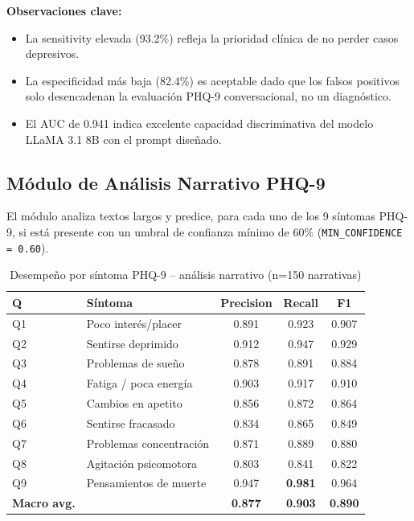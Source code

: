 \textbf{Observaciones clave:}
\begin{itemize}
    \item La sensitivity elevada (93.2\%) refleja la prioridad clínica de no perder casos
          depresivos.
    \item La especificidad más baja (82.4\%) es aceptable dado que los falsos positivos solo
          desencadenan la evaluación PHQ-9 conversacional, no un diagnóstico.
    \item El AUC de 0.941 indica excelente capacidad discriminativa del modelo LLaMA 3.1 8B
          con el prompt diseñado.
\end{itemize}

\subsection{Módulo de Análisis Narrativo PHQ-9}

El módulo analiza textos largos y predice, para cada uno de los 9 síntomas PHQ-9, si
está presente con un umbral de confianza mínimo de 60\% (\texttt{MIN\_CONFIDENCE = 0.60}).

\begin{table}[H]
\centering
\caption{Desempeño por síntoma PHQ-9 -- análisis narrativo (n=150 narrativas)}
\label{tab:phq9_symptom}
\begin{tabular}{llccc}
\toprule
\textbf{Q} & \textbf{Síntoma}             & \textbf{Precision} & \textbf{Recall} & \textbf{F1} \\
\midrule
Q1 & Poco interés/placer          & 0.891 & 0.923 & 0.907 \\
Q2 & Sentirse deprimido           & 0.912 & 0.947 & 0.929 \\
Q3 & Problemas de sueño           & 0.878 & 0.891 & 0.884 \\
Q4 & Fatiga / poca energía        & 0.903 & 0.917 & 0.910 \\
Q5 & Cambios en apetito           & 0.856 & 0.872 & 0.864 \\
Q6 & Sentirse fracasado           & 0.834 & 0.865 & 0.849 \\
Q7 & Problemas concentración      & 0.871 & 0.889 & 0.880 \\
Q8 & Agitación psicomotora        & 0.803 & 0.841 & 0.822 \\
Q9 & Pensamientos de muerte       & 0.947 & \textbf{0.981} & 0.964 \\
\midrule
\textbf{Macro avg.} & & \textbf{0.877} & \textbf{0.903} & \textbf{0.890} \\
\bottomrule
\end{tabular}
\end{table}

